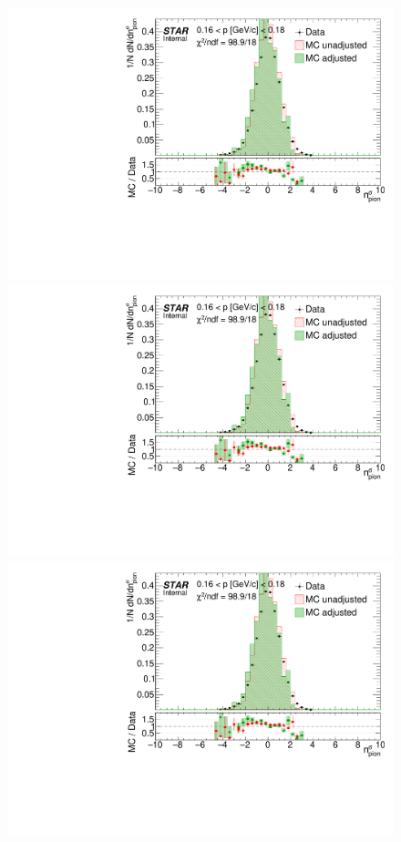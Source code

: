\begin{figure}[ht]
{}~
\parbox{0.495\textwidth}{
  \centering
  \includegraphics[width=\linewidth,page=3]{graphics/dedx/nSigmaPion_DataVsMC.pdf}\\[3pt]
  \includegraphics[width=\linewidth,page=5]{graphics/dedx/nSigmaPion_DataVsMC.pdf}\\[3pt]
  \includegraphics[width=\linewidth,page=7]{graphics/dedx/nSigmaPion_DataVsMC.pdf}\\[3pt]
}
\end{figure}
